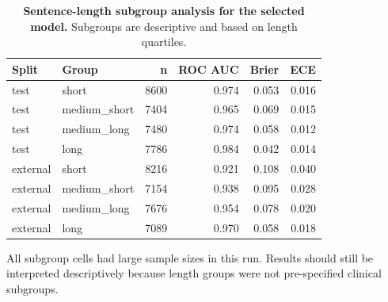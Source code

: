 \begin{table}[!ht]
\centering
\caption{\textbf{Sentence-length subgroup analysis for the selected model.} Subgroups are descriptive and based on length quartiles.}
\begin{tabular}{llrrrr}
\hline
Split & Group & n & ROC AUC & Brier & ECE \\
\hline
test & short & 8600 & 0.974 & 0.053 & 0.016 \\
test & medium\_short & 7404 & 0.965 & 0.069 & 0.015 \\
test & medium\_long & 7480 & 0.974 & 0.058 & 0.012 \\
test & long & 7786 & 0.984 & 0.042 & 0.014 \\
external & short & 8216 & 0.921 & 0.108 & 0.040 \\
external & medium\_short & 7154 & 0.938 & 0.095 & 0.028 \\
external & medium\_long & 7676 & 0.954 & 0.078 & 0.020 \\
external & long & 7089 & 0.970 & 0.058 & 0.018 \\
\hline
\end{tabular}
\begin{flushleft}\footnotesize All subgroup cells had large sample sizes in this run. Results should still be interpreted descriptively because length groups were not pre-specified clinical subgroups.\end{flushleft}
\label{tab:subgroup}
\end{table}
